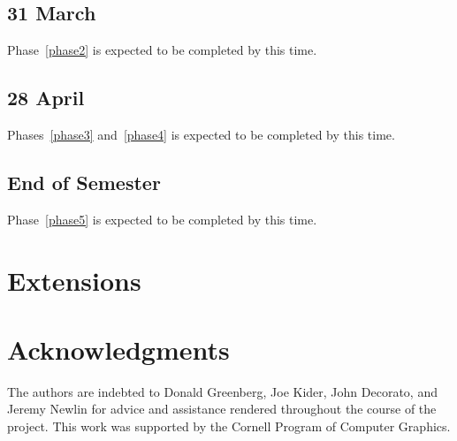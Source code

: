 \documentclass{scrartcl}
\begin{document}
    \subsection{31 March}
      Phase~\ref{phase2} is expected to be completed by this time.
    \subsection{28 April}
      Phases~\ref{phase3} and~\ref{phase4} is expected to be completed by this time.
    \subsection{End of Semester}
      Phase~\ref{phase5} is expected to be completed by this time. %
  \section{Extensions}
  \section{Acknowledgments}
    The authors are indebted to Donald Greenberg, Joe Kider, John Decorato, and Jeremy Newlin for advice and assistance rendered throughout the course of the project. This work was supported by the Cornell Program of Computer Graphics.
\end{document}
